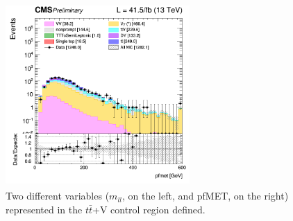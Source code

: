 \documentclass[a4paper, 10pt, openright]{report}
\begin{document}
\begin{figure}[htbp]
{\begin{minipage}[b]{.48\textwidth}
\end{minipage}\hfill
\begin{minipage}[b]{.48\textwidth}
\includegraphics[width=7cm, height=7cm]{figs/log_cratio_ttVCR_ll_METcorrected_pt_2017.png}
\end{minipage} \hfill
}
\caption{Two different variables ($m_{ll}$, on the left, and pf\ac{MET}, on the right) represented in the $t \bar t$+V control region defined.}
\label{fig:ttVCR}
\end{figure}
\end{document}
